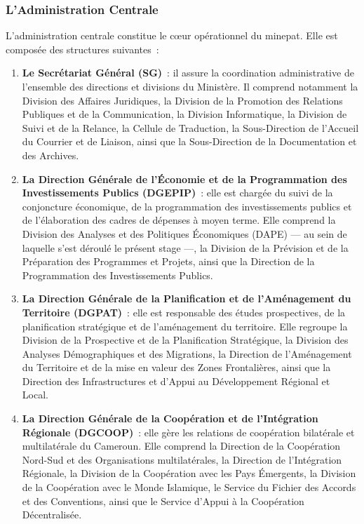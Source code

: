 \documentclass[12pt, a4paper, oneside]{report}
\begin{document}
\subsubsection{L'Administration Centrale}

L'administration centrale constitue le c\oe ur opérationnel du \gls{minepat}. Elle est
composée des structures suivantes~:

\begin{enumerate}
	
	\item \textbf{Le Secrétariat Général (SG)}~: il assure la coordination administrative
	de l'ensemble des directions et divisions du Ministère. Il comprend notamment la
	Division des Affaires Juridiques, la Division de la Promotion des Relations Publiques
	et de la Communication, la Division Informatique, la Division de Suivi et de la
	Relance, la Cellule de Traduction, la Sous-Direction de l'Accueil du Courrier et de
	Liaison, ainsi que la Sous-Direction de la Documentation et des Archives.
	
	\item \textbf{La Direction Générale de l'Économie et de la Programmation des
		Investissements Publics (DGEPIP)}~: elle est chargée du suivi de la conjoncture
	économique, de la programmation des investissements publics et de l'élaboration des
	cadres de dépenses à moyen terme. Elle comprend la Division des Analyses et des
	Politiques Économiques (DAPE) --- au sein de laquelle s'est déroulé le présent
	stage ---, la Division de la Prévision et de la Préparation des Programmes et
	Projets, ainsi que la Direction de la Programmation des Investissements Publics.
	
	\item \textbf{La Direction Générale de la Planification et de l'Aménagement du
		Territoire (DGPAT)}~: elle est responsable des études prospectives, de la planification
	stratégique et de l'aménagement du territoire. Elle regroupe la Division de la
	Prospective et de la Planification Stratégique, la Division des Analyses
	Démographiques et des Migrations, la Direction de l'Aménagement du Territoire et
	de la mise en valeur des Zones Frontalières, ainsi que la Direction des
	Infrastructures et d'Appui au Développement Régional et Local.
	
	\item \textbf{La Direction Générale de la Coopération et de l'Intégration Régionale
		(DGCOOP)}~: elle gère les relations de coopération bilatérale et multilatérale du
	Cameroun. Elle comprend la Direction de la Coopération Nord-Sud et des
	Organisations multilatérales, la Direction de l'Intégration Régionale, la Division
	de la Coopération avec les Pays Émergents, la Division de la Coopération avec le
	Monde Islamique, le Service du Fichier des Accords et des Conventions, ainsi que
	le Service d'Appui à la Coopération Décentralisée.
	

\end{enumerate}
\end{document}
